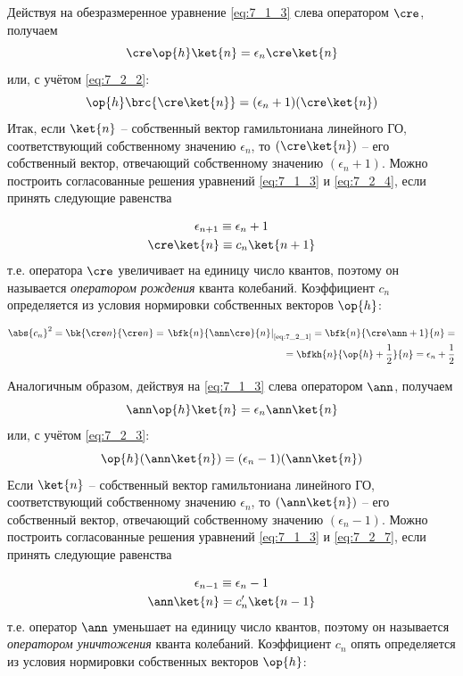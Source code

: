 Действуя на обезразмеренное уравнение \eqref{eq:7_1_3} слева оператором $\cre$, получаем
$$
\cre \op{h} \ket{n} = \epsilon_n \cre \ket{n}
$$%
%
или, с учётом \eqref{eq:7_2_2}:
\begin{equation}
\label{eq:7_2_4}
\op{h} \brc{\cre \ket{n}} = (\epsilon_n + 1)(\cre \ket{n})
\end{equation}%
%
Итак, если $\ket{n}$ -- собственный вектор гамильтониана линейного ГО, соответствующий собственному значению $\epsilon_n$, то $(\cre \ket{n})$ -- его собственный вектор, отвечающий собственному значению $(\epsilon_n + 1)$. Можно построить согласованные решения уравнений \eqref{eq:7_1_3} и \eqref{eq:7_2_4}, если принять следующие равенства

\begin{equation}
\label{eq:7_2_5}
\begin{gathered}
\epsilon_{n+1} \equiv \epsilon_n + 1 \\
\cre \ket{n} \equiv c_n \ket{n+1}
\end{gathered}
\end{equation}%
%
т.е. оператора $\cre$ увеличивает на единицу число квантов, поэтому он называется {\em оператором рождения} кванта колебаний. Коэффициент $c_n$ определяется из условия нормировки собственных векторов $\op{h}$:

\begin{equation}
\label{eq:7_2_6}
\begin{split}
\abs{c_n}^2 = \bk{\cre n}{\cre n} = \left. \bfk{n}{\ann\cre}{n} \right|_{\text{\eqref{eq:7_2_1}}} = \bfk{n}{\cre\ann + 1}{n} =\\= \bfkh{n}{\op{h} + \frac{1}{2}}{n} = \epsilon_n + \frac{1}{2}
\end{split}
\end{equation}

Аналогичным образом, действуя на \eqref{eq:7_1_3} слева оператором $\ann$, получаем
$$
\ann\op{h} \ket{n} = \epsilon_n \ann \ket{n}
$$%
%
или, с учётом \eqref{eq:7_2_3}:
\begin{equation}
\label{eq:7_2_7}
\op{h}(\ann\ket{n}) = (\epsilon_n - 1)(\ann \ket{n})
\end{equation}%
%
Если $\ket{n}$ -- собственный вектор гамильтониана линейного ГО, соответствующий собственному значению $\epsilon_n$, то $(\ann \ket{n})$ -- его собственный вектор, отвечающий собственному значению $(\epsilon_n - 1)$. Можно построить согласованные решения уравнений \eqref{eq:7_1_3} и \eqref{eq:7_2_7}, если принять следующие равенства

\begin{equation}
\label{eq:7_2_8}
\begin{gathered}
\epsilon_{n-1} \equiv \epsilon_n - 1 \\
\ann \ket{n} = c_{n}' \ket{n-1}
\end{gathered}
\end{equation}%
%
т.е. оператор $\ann$ уменьшает на единицу число квантов, поэтому он называется {\em оператором уничтожения} кванта колебаний. Коэффициент $c_n$ опять определяется из условия нормировки собственных векторов $\op{h}$:

